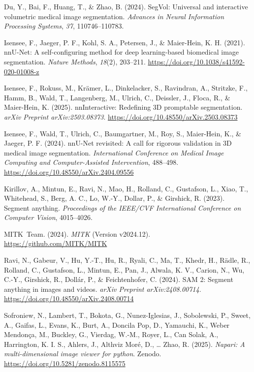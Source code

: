 \documentclass[
]{article}
\newlength{\cslhangindent}
\newenvironment{CSLReferences}[2] %
 {\begin{list}{}{%
  \setlength{\itemindent}{0pt}
  \setlength{\leftmargin}{0pt}
  \setlength{\parsep}{0pt}
  \ifodd #1
   \setlength{\leftmargin}{\cslhangindent}
   \setlength{\itemindent}{-1\cslhangindent}
  \fi
  \setlength{\itemsep}{#2\baselineskip}}}
 {\end{list}}
\begin{document}
\begin{CSLReferences}{1}{0}
Du, Y., Bai, F., Huang, T., \& Zhao, B. (2024). {SegVol}: Universal and
interactive volumetric medical image segmentation. \emph{Advances in
Neural Information Processing Systems}, \emph{37}, 110746--110783.

Isensee, F., Jaeger, P. F., Kohl, S. A., Petersen, J., \& Maier-Hein, K.
H. (2021). {nnU-Net}: A self-configuring method for deep learning-based
biomedical image segmentation. \emph{Nature Methods}, \emph{18}(2),
203--211. \url{https://doi.org/10.1038/s41592-020-01008-z}

Isensee, F., Rokuss, M., Krämer, L., Dinkelacker, S., Ravindran, A.,
Stritzke, F., Hamm, B., Wald, T., Langenberg, M., Ulrich, C., Deissler,
J., Floca, R., \& Maier-Hein, K. (2025). nnInteractive: Redefining 3D
promptable segmentation. \emph{arXiv Preprint arXiv:2503.08373}.
\url{https://doi.org/10.48550/arXiv.2503.08373}

Isensee, F., Wald, T., Ulrich, C., Baumgartner, M., Roy, S., Maier-Hein,
K., \& Jaeger, P. F. (2024). {nnU-Net} revisited: A call for rigorous
validation in {3D} medical image segmentation. \emph{International
Conference on Medical Image Computing and Computer-Assisted
Intervention}, 488--498. \url{https://doi.org/10.48550/arXiv.2404.09556}

Kirillov, A., Mintun, E., Ravi, N., Mao, H., Rolland, C., Gustafson, L.,
Xiao, T., Whitehead, S., Berg, A. C., Lo, W.-Y., Dollar, P., \&
Girshick, R. (2023). Segment anything. \emph{Proceedings of the IEEE/CVF
International Conference on Computer Vision}, 4015--4026.

MITK~Team. (2024). \emph{{MITK}} (Version v2024.12).
\url{https://github.com/MITK/MITK}

Ravi, N., Gabeur, V., Hu, Y.-T., Hu, R., Ryali, C., Ma, T., Khedr, H.,
Rädle, R., Rolland, C., Gustafson, L., Mintun, E., Pan, J., Alwala, K.
V., Carion, N., Wu, C.-Y., Girshick, R., Dollár, P., \& Feichtenhofer,
C. (2024). {SAM} 2: Segment anything in images and videos. \emph{arXiv
Preprint arXiv:2408.00714}.
\url{https://doi.org/10.48550/arXiv.2408.00714}

Sofroniew, N., Lambert, T., Bokota, G., Nunez-Iglesias, J., Sobolewski,
P., Sweet, A., Gaifas, L., Evans, K., Burt, A., Doncila Pop, D.,
Yamauchi, K., Weber Mendonça, M., Buckley, G., Vierdag, W.-M., Royer,
L., Can Solak, A., Harrington, K. I. S., Ahlers, J., Althviz Moré, D.,
\ldots{} Zhao, R. (2025). \emph{Napari: A multi-dimensional image viewer
for python}. Zenodo. \url{https://doi.org/10.5281/zenodo.8115575}


\end{CSLReferences}
\end{document}
